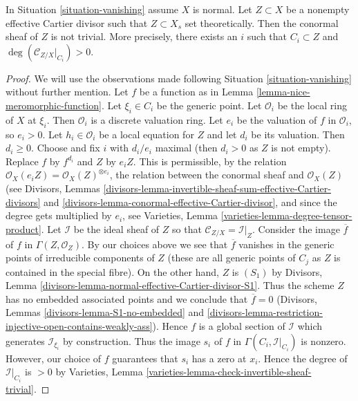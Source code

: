 \begin{lemma}
\label{lemma-nontrivial-normal-bundle}
In Situation \ref{situation-vanishing} assume $X$ is normal.
Let $Z \subset X$ be a nonempty effective Cartier divisor such that
$Z \subset X_s$ set theoretically.
Then the conormal sheaf of $Z$ is not trivial.
More precisely, there exists an $i$ such that $C_i \subset Z$
and $\deg(\mathcal{C}_{Z/X}|_{C_i}) > 0$.
\end{lemma}

\begin{proof}
We will use the observations made following Situation \ref{situation-vanishing}
without further mention. Let $f$ be a function as in
Lemma \ref{lemma-nice-meromorphic-function}.
Let $\xi_i \in C_i$ be the generic point. Let
$\mathcal{O}_i$ be the local ring of $X$ at $\xi_i$. Then $\mathcal{O}_i$
is a discrete valuation ring. Let $e_i$ be the valuation of
$f$ in $\mathcal{O}_i$, so $e_i > 0$. Let $h_i \in \mathcal{O}_i$ be a local
equation for $Z$ and let $d_i$ be its valuation. Then $d_i \geq 0$.
Choose and fix $i$ with $d_i/e_i$ maximal (then $d_i > 0$ as
$Z$ is not empty). Replace $f$ by $f^{d_i}$ and $Z$ by $e_iZ$.
This is permissible, by the relation
$\mathcal{O}_X(e_i Z) = \mathcal{O}_X(Z)^{\otimes e_i}$,
the relation between the conormal sheaf and $\mathcal{O}_X(Z)$
(see Divisors, Lemmas
\ref{divisors-lemma-invertible-sheaf-sum-effective-Cartier-divisors}
and \ref{divisors-lemma-conormal-effective-Cartier-divisor}, and
since the degree gets multiplied by $e_i$, see
Varieties, Lemma \ref{varieties-lemma-degree-tensor-product}.
Let $\mathcal{I}$ be the ideal sheaf of $Z$ so that
$\mathcal{C}_{Z/X} = \mathcal{I}|_Z$. Consider the image $\overline{f}$
of $f$ in $\Gamma(Z, \mathcal{O}_Z)$. By our choices above we see
that $\overline{f}$ vanishes in the generic points of irreducible
components of $Z$ (these are all generic points of $C_j$ as $Z$ is
contained in the special fibre). On the other hand, $Z$ is $(S_1)$ by
Divisors, Lemma \ref{divisors-lemma-normal-effective-Cartier-divisor-S1}.
Thus the scheme $Z$ has no embedded associated points and
we conclude that $\overline{f} = 0$ (Divisors, Lemmas
\ref{divisors-lemma-S1-no-embedded} and
\ref{divisors-lemma-restriction-injective-open-contains-weakly-ass}).
Hence $f$ is a global section of $\mathcal{I}$
which generates $\mathcal{I}_{\xi_i}$ by construction.
Thus the image $s_i$ of $f$ in $\Gamma(C_i, \mathcal{I}|_{C_i})$ is nonzero.
However, our choice of $f$ guarantees that $s_i$ has a zero at $x_i$.
Hence the degree of $\mathcal{I}|_{C_i}$ is $>0$ by
Varieties, Lemma \ref{varieties-lemma-check-invertible-sheaf-trivial}.
\end{proof}

